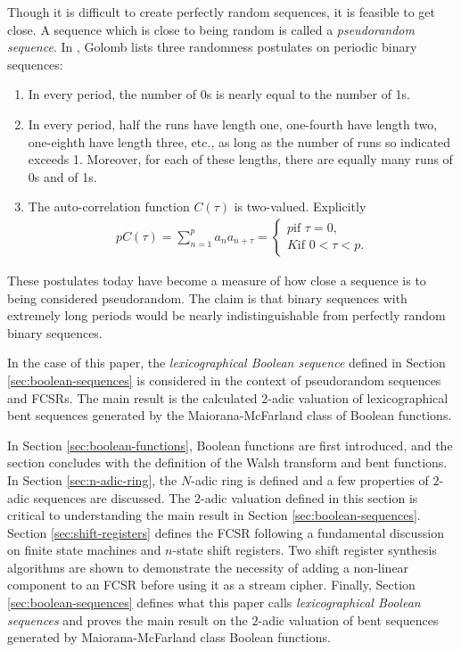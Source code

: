\par Though it is difficult to create perfectly random sequences, it is feasible
to get close. A sequence which is close to being random is called a
{\em pseudorandom sequence}. In \cite{bk:g82}, Golomb lists three randomness
postulates on periodic binary sequences:
\begin{enumerate}[R-1.]
	\item In every period, the number of 0s is nearly equal to the number of 1s.
	\item In every period, half the runs have length one, one-fourth have length
		two, one-eighth have length three, etc., as long as the number of runs so
		indicated exceeds 1. Moreover, for each of these lengths, there are equally
		many runs of 0s and of 1s.
	\item The auto-correlation function $C(\tau)$ is two-valued. Explicitly
		\begin{align*}
			pC(\tau)=\sum_{n=1}^pa_na_{n+\tau}=
			\begin{cases}
				p \text{if } \tau=0,\\
				K \text{if } 0<\tau<p.
			\end{cases}
		\end{align*}
\end{enumerate}
These postulates today have become a measure of how close a sequence is to being
considered pseudorandom. The claim is that binary sequences with extremely long
periods would be nearly indistinguishable from perfectly random binary
sequences.
\par In the case of this paper, the {\it lexicographical Boolean sequence} defined
in Section \ref{sec:boolean-sequences} is considered in the context of
pseudorandom sequences and FCSRs. The main result is the calculated 2-adic
valuation of lexicographical bent sequences generated by the Maiorana-McFarland
class of Boolean functions.
\par In Section \ref{sec:boolean-functions}, Boolean
functions are first introduced, and the section concludes with the definition of
the Walsh transform and bent functions. In Section \ref{sec:n-adic-ring}, the
$N$-adic ring is defined and a few properties of $2$-adic sequences are
discussed. The $2$-adic valuation defined in this section is critical to
understanding the main result in Section \ref{sec:boolean-sequences}. Section
\ref{sec:shift-registers} defines the FCSR following a fundamental discussion on
finite state machines and $n$-state shift registers. Two shift register
synthesis algorithms are shown to demonstrate the necessity of adding a
non-linear component to an FCSR before using it as a stream cipher. Finally,
Section \ref{sec:boolean-sequences} defines what this paper calls {\it
lexicographical Boolean sequences} and proves the main result on the $2$-adic
valuation of bent sequences generated by Maiorana-McFarland class Boolean functions.
